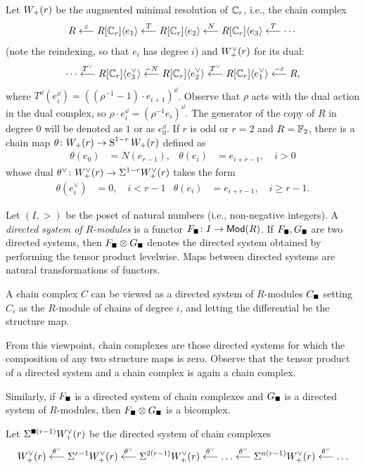 Let $W_+(r)$ be the augmented minimal resolution of $\mathbb{C}_r$, i.e., the chain complex
\[
R
\overset{\varepsilon}{\longleftarrow} 
R[\mathbb{C}_r]\langle e_{1}\rangle
\overset{T}{\longleftarrow}
R[\mathbb{C}_r]\langle e_{2}\rangle
\overset{N}{\longleftarrow}
R[\mathbb{C}_r]\langle e_{3}\rangle
\overset{T}{\longleftarrow}
\dotsb
\]
(note the reindexing, so that $e_i$ has degree $i$) and $W^\vee_+(r)$ for its dual:
\[
\dotsb
\overset{T^\vee}{\longleftarrow}
R[\mathbb{C}_r]\langle e_{3}^\vee\rangle
\overset{-N}{\longleftarrow}
R[\mathbb{C}_r]\langle e_{2}^\vee\rangle
\overset{T^\vee}{\longleftarrow}
R[\mathbb{C}_r]\langle e_{1}^\vee\rangle
\overset{-\varepsilon}{\longleftarrow} 
R,
\]
where $T^\dd(e_i^\dd)=\left((\rho^{-1}-1)\cdot e_{i+1}\right)^\dd$.
Observe that $\rho$ acts with the dual action in the dual complex, so $\rho \cdot e_{i}^\dd = (\rho^{-1} e_i)^{\dd}$.
The generator of the copy of $R$ in degree $0$ will be denoted as $1$ or as $e_0^\dd$.
If $r$ is odd or $r=2$ and $R=\mathbb{F}_2$, there is a chain map $\theta \colon W_+(r) \to \operatorname{S}^{1-r}W_+(r)$ defined as 
\begin{align*}
	\theta(e_0) &= N(e_{r-1}),
	&
	\theta(e_{i}) &= e_{i+r-1}, \quad i>0 
\end{align*}
whose dual $\theta^\vee\colon W^\vee_+(r)\to \Sigma^{1-r}W^\vee_+(r)$ takes the form
\begin{align*}
	\theta(e_{i}^{\vee}) &= 0, \quad i < r-1
	&
	\theta(e_{i}) &= e_{i+r-1}, \quad i\geq r-1.
\end{align*}

Let $(I,>)$ be the poset of natural numbers (i.e., non-negative integers). A \emph{directed system of $R$-modules} is a functor $F_\bs\colon I\to \Mod{R}$. If $F_\bs,G_{\bs}$ are two directed systems, then $F_\bs\ot G_{\bs}$ denotes the directed system obtained by performing the tensor product levelwise. Maps between directed systems are natural transformations of functors. 

A chain complex $C$ can be viewed as a directed system of $R$-modules $C_{\bs}$ setting $C_i$ as the $R$-module of chains of degree $i$, and letting the differential be the structure map. 

From this viewpoint, chain complexes are those directed systems for which the composition of any two structure maps is zero. Observe that the tensor product of a directed system and a chain complex is again a chain complex.

Similarly, if $F_\bs$ is a directed system of chain complexes and $G_\bs$ is a directed system of $R$-modules, then $F_\bs \otimes G_\bs$ is a bicomplex.

\begin{definition} Let $\susp{\bs(r-1)}\Wdualaug{r}$ be the directed system of chain complexes
\[
	W^\vee_+(r)\overset{\theta^\vee}{\longleftarrow }
	\Sigma^{r-1}W^\vee_+(r)\overset{\theta^\vee}{\longleftarrow }
	\Sigma^{2(r-1)}W^\vee_+(r) \overset{\theta^\vee}{\longleftarrow }
	\ldots
	\overset{\theta^\vee}{\longleftarrow }	
	\Sigma^{n(r-1)}W^\vee_+(r) \overset{\theta^\vee}{\longleftarrow }
	\ldots
\]
\end{definition}

